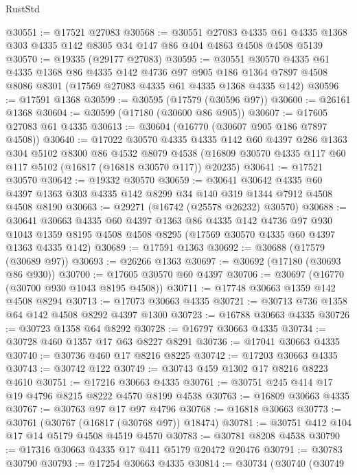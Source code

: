 \begin{lexlean}{RustStd}
\begin{coremodule}
@30551 := @17521 @27083
@30568 := @30551
    @27083
    @4335
    @61
    @4335
    @1368
    @303
    @4335
    @142
    @8305
    @34
    @147
    @86
    @404
    @4863
    @4508
    @4508
    @5139
@30570 := @19335 (@29177 @27083)
@30595 := @30551
    @30570
    @4335
    @61
    @4335
    @1368
    @86
    @4335
    @142
    @4736
    @97
    @905
    @186
    @1364
    @7897
    @4508
    @8086
    @8301
    (@17569 @27083 @4335 @61 @4335 @1368 @4335 @142)
@30596 := @17591 @1368
@30599 := @30595 (@17579 (@30596 @97))
@30600 := @26161 @1368
@30604 := @30599 (@17180 (@30600 @86 @905))
@30607 := @17605 @27083 @61 @4335
@30613 := @30604 (@16770 (@30607 @905 @186 @7897 @4508))
@30640 := @17022
    @30570
    @4335
    @4335
    @142
    @60
    @4397
    @286
    @1363
    @304
    @5102
    @8300
    @86
    @4532
    @8079
    @4538
    (@16809 @30570 @4335 @117 @60 @117 @5102 (@16817 (@16818 @30570 @117)) @20235)
@30641 := @17521 @30570
@30642 := @19332 @30570
@30659 := @30641
    @30642
    @4335
    @60
    @4397
    @1363
    @303
    @4335
    @142
    @8299
    @34
    @140
    @319
    @1344
    @7912
    @4508
    @4508
    @8190
@30663 := @29271 (@16742 (@25578 @26232) @30570)
@30688 := @30641
    @30663
    @4335
    @60
    @4397
    @1363
    @86
    @4335
    @142
    @4736
    @97
    @930
    @1043
    @1359
    @8195
    @4508
    @4508
    @8295
    (@17569 @30570 @4335 @60 @4397 @1363 @4335 @142)
@30689 := @17591 @1363
@30692 := @30688 (@17579 (@30689 @97))
@30693 := @26266 @1363
@30697 := @30692 (@17180 (@30693 @86 @930))
@30700 := @17605 @30570 @60 @4397
@30706 := @30697 (@16770 (@30700 @930 @1043 @8195 @4508))
@30711 := @17748 @30663 @1359 @142 @4508 @8294
@30713 := @17073 @30663 @4335
@30721 := @30713 @736 @1358 @64 @142 @4508 @8292 @4397 @1300
@30723 := @16788 @30663 @4335
@30726 := @30723 @1358 @64 @8292
@30728 := @16797 @30663 @4335
@30734 := @30728 @460 @1357 @17 @63 @8227 @8291
@30736 := @17041 @30663 @4335
@30740 := @30736 @460 @17 @8216 @8225
@30742 := @17203 @30663 @4335
@30743 := @30742 @122
@30749 := @30743 @459 @1302 @17 @8216 @8223 @4610
@30751 := @17216 @30663 @4335
@30761 := @30751 @245 @414 @17 @19 @4796 @8215 @8222 @4570 @8199 @4538
@30763 := @16809 @30663 @4335
@30767 := @30763 @97 @17 @97 @4796
@30768 := @16818 @30663
@30773 := @30761 (@30767 (@16817 (@30768 @97)) @18474)
@30781 := @30751 @412 @104 @17 @14 @5179 @4508 @4519 @4570
@30783 := @30781 @8208 @4538
@30790 := @17316 @30663 @4335 @17 @411 @5179 @20472 @20476
@30791 := @30783 @30790
@30793 := @17254 @30663 @4335
@30814 := @30734
    (@30740
      (@30749

\end{coremodule}
\end{lexlean}
